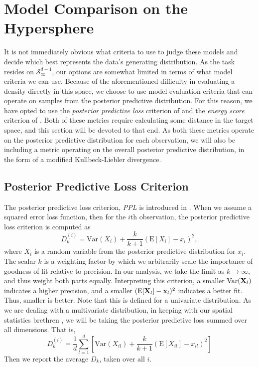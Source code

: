 \section{Model Comparison on the Hypersphere}
\label{sec:evaluation}
It is not immediately obvious what criteria to use to judge these models and decide which best
  represents the data's generating distribution.  As the task resides on $\mathcal{S}_{\infty}^{d-1}$,
  our options are somewhat limited in terms of what model criteria we can use.  Because of the aforementioned
  difficulty in evaluating a density directly in this space, we choose to use model evaluation
  criteria that can operate on samples from the posterior predictive distribution.  For this reason,
  we have opted to use the \emph{posterior predictive loss} criterion of \cite{gelfand1998} and the
  \emph{energy score} criterion of \cite{gneiting2007}.  Both of these metrics require calculating
  some distance in the target space, and this section will be devoted to that end.  As both these
  metrics operate on the posterior predictive distribution for each observation, we will also be
  including a metric operating on the overall posterior predictive distribution, in the form of a
  modified Kullbeck-Liebler divergence.

\subsection{Posterior Predictive Loss Criterion}
The posterior predictive loss criterion, \emph{PPL} is introduced in \cite{gelfand1998}.  When we
  assume a squared error loss function, then for the $i$th observation, the posterior predictive
  loss criterion is computed as
  \begin{equation}
    \label{eq:ppl}
    D_{k}^{(i)} = \text{Var}(X_i) + \frac{k}{k + 1}\left(\text{E}[X_i] - x_i\right)^2,
  \end{equation}
  where $X_i$ is a random variable from the posterior predictive distribution for $x_i$.  The
  scalar $k$ is a weighting factor by which we arbitrarily scale the importance of goodness of fit
  relative to precision.  In our analysis, we take the limit as $k\to\infty$, and thus weight both
  parts equally.  Interpreting this criterion, a smaller $\text{Var}({\bf X}_l)$ indicates a higher
  precision, and a smaller $(\text{E}[{\bf X}_l] - {\bf x}_l)^2$  indicates a better fit.  Thus,
  smaller is better.  Note that this is defined for a univariate distribution.  As we are dealing
  with a multivariate distribution, in keeping with our spatial statistics brethren
  , we will be taking the posterior predictive loss
  summed over all dimensions.  That is,
  \begin{equation}
    \label{eq:ppl2}
    D_k^{(i)} = \frac{1}{d}\sum_{l = 1}^{d}\left[\text{Var}(X_{il}) + \frac{k}{k+1}\left(\text{E}[X_{il}] - x_{il}\right)^2\right]
  \end{equation}
  Then we report the average $D_k$, taken over all $i$.

